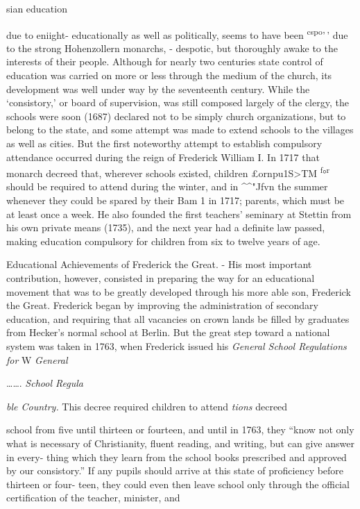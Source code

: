 \documentclass[
]{book}
\begin{document}
sian education

due to eniight- educationally as well as politically, seems to have been \textsuperscript{cspo}'\,' due to the strong Hohenzollern monarchs, - despotic, but thoroughly awake to the interests of their people. Although for nearly two centuries state control of education was carried on more or less through the medium of the church, its development was well under way by the seventeenth century. While the `consistory,' or board of supervision, was still composed largely of the clergy, the schools were soon (1687) declared not to be simply church organizations, but to belong to the state, and some attempt was made to extend schools to the villages as well as cities. But the first noteworthy attempt to establish compulsory attendance occurred during the reign of Frederick William I. In 1717 that monarch decreed that, wherever schools existed, children £ornpu1S\textgreater TM \textsuperscript{f}°\textsuperscript{r} should be required to attend during the winter, and in \textbar*\^{}\^{}"Jfvn the summer whenever they could be spared by their Bam 1 in 1717; parents, which must be at least once a week. He also founded the first teachers' seminary at Stettin from his own private means (1735), and the next year had a definite law passed, making education compulsory for children from six to twelve years of age.

Educational Achievements of Frederick the Great. - His most important contribution, however, consisted in preparing the way for an educational movement that was to be greatly developed through his more able son, Frederick the Great. Frederick began by improving the administration of secondary education, and requiring that all vacancies on crown lands be filled by graduates from Hecker's normal school at Berlin. But the great step toward a national system was taken in 1763, when Frederick issued his \emph{General School Regulations for} W \emph{General}

\ldots\ldots. \emph{School Regula}

\emph{ble Country.} This decree required children to attend \emph{tions} decreed

school from five until thirteen or fourteen, and until in 1763, they ``know not only what is necessary of Christianity, fluent reading, and writing, but can give answer in every- thing which they learn from the school books prescribed and approved by our consistory.'' If any pupils should arrive at this state of proficiency before thirteen or four- teen, they could even then leave school only through the official certification of the teacher, minister, and
\end{document}

